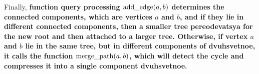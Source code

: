 Finally, \bf{function query processing} ${\rm add\_edge}(a,b)$ determines the connected components, which are vertices $a$ and $b$, and if they lie in different connected components, then a smaller tree pereodevatsya for the new root and then attached to a larger tree. Otherwise, if vertex $a$ and $b$ lie in the same tree, but in different components of dvuhsvetnoe, it calls the function ${\rm merge\_path}(a,b)$, which will detect the cycle and compresses it into a single component dvuhsvetnoe.



